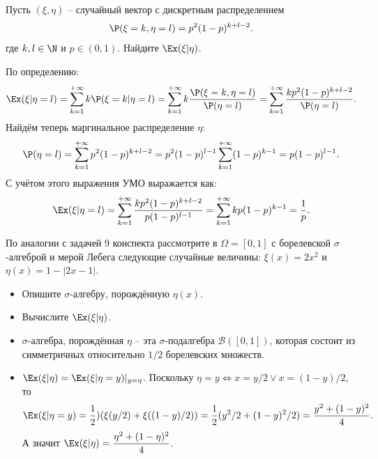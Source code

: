 \begin{problem}
    Пусть $(\xi, \eta)$ -- случайный вектор с дискретным распределением
    \[
        \P(\xi = k, \eta = l) = p^2(1 - p)^{k + l - 2}.
    \]
    где $k, l \in \N$ и $p \in (0, 1)$.
    Найдите $\Ex(\xi | \eta)$.
\end{problem}
\begin{solution}
    По определению:
    \[
        \Ex(\xi|\eta = l) = \sum\limits_{k = 1}^{+\infty} k \P(\xi = k | \eta = l) = \sum\limits_{k = 1}^{+\infty} k \dfrac{\P(\xi = k, \eta = l)}{\P(\eta = l)} = \sum\limits_{k = 1}^{+\infty} \dfrac{kp^2 (1 - p)^{k + l - 2}}{\P(\eta = l)}.
    \]
    Найдём теперь маргинальное распределение $\eta$:
    \[
        \P(\eta = l) = \sum\limits_{k = 1}^{+\infty} p^2 (1 - p)^{k + l - 2} = p^2(1 - p)^{l - 1}\sum\limits_{k = 1}^{+\infty} (1 - p)^{k - 1} = p(1 - p)^{l - 1}.
    \]
    С учётом этого выражения УМО выражается как:
    \[
        \Ex(\xi|\eta = l) = \sum\limits_{k = 1}^{+\infty} \dfrac{k p^2 (1 - p)^{k + l - 2}}{p (1 - p)^{l - 1}} = \sum\limits_{k = 1}^{+\infty}kp(1 - p)^{k - 1} = \dfrac{1}{p}.
    \]
\end{solution}
\begin{problem}
    По аналогии с задачей 9 конспекта рассмотрите в $\Omega = [0, 1]$ с борелевской $\sigma$-алгеброй и мерой Лебега следующие случайные величины:
    $\xi(x) = 2x^2$ и $\eta(x) = 1 - |2x - 1|$.
    \begin{itemize}
        \item Опишите $\sigma$-алгебру, порождённую $\eta(x)$.
        \item Вычислите $\Ex(\xi|\eta)$.
    \end{itemize}
\end{problem}
\begin{solution} \leavevmode
    \begin{itemize}
        \item $\sigma$-алгебра, порождённая $\eta$ -- эта $\sigma$-подалгебра $\mathcal{B}([0, 1])$, которая состоит из симметричных относительно $1/2$ борелевских множеств.
        \item $\Ex(\xi|\eta) = \Ex(\xi|\eta = y)|_{y = \eta}$.
        Поскольку $\eta = y \Longleftrightarrow x = y/2 \vee x = (1 - y)/2$, то
        \[
            \Ex(\xi|\eta = y) = \dfrac{1}{2})(\xi(y/2) + \xi((1 - y)/2)) = \dfrac{1}{2}(y^2/2 + (1 - y)^2/2) = \dfrac{y^2 + (1 - y)^2}{4}.
        \]
        А значит $\Ex(\xi|\eta) = \dfrac{\eta^2 + (1 - \eta)^2}{4}$.
    \end{itemize}
\end{solution}
